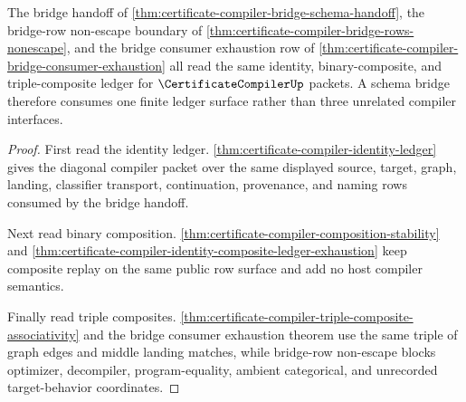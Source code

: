 \begin{theorem}
\label{thm:certificate-compiler-bridge-associativity-split-index}
The bridge handoff of \autoref{thm:certificate-compiler-bridge-schema-handoff}, the bridge-row non-escape boundary of \autoref{thm:certificate-compiler-bridge-rows-nonescape}, and the bridge consumer exhaustion row of \autoref{thm:certificate-compiler-bridge-consumer-exhaustion} all read the same identity, binary-composite, and triple-composite ledger for $\CertificateCompilerUp$ packets. A schema bridge therefore consumes one finite ledger surface rather than three unrelated compiler interfaces.
\end{theorem}
\begin{proof}
First read the identity ledger. \autoref{thm:certificate-compiler-identity-ledger} gives the diagonal compiler packet over the same displayed source, target, graph, landing, classifier transport, continuation, provenance, and naming rows consumed by the bridge handoff.

Next read binary composition. \autoref{thm:certificate-compiler-composition-stability} and \autoref{thm:certificate-compiler-identity-composite-ledger-exhaustion} keep composite replay on the same public row surface and add no host compiler semantics.

Finally read triple composites. \autoref{thm:certificate-compiler-triple-composite-associativity} and the bridge consumer exhaustion theorem use the same triple of graph edges and middle landing matches, while bridge-row non-escape blocks optimizer, decompiler, program-equality, ambient categorical, and unrecorded target-behavior coordinates.
\end{proof}
